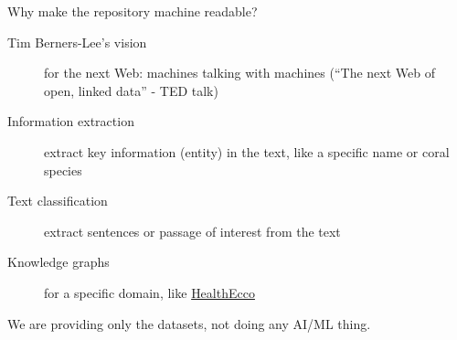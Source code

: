 \documentclass{beamer}
\begin{document}
\begin{frame}{Why make the repository machine readable?}
    \begin{description}
        \item [Tim Berners-Lee's vision] for the next Web: machines talking with machines (``The next Web of open, linked data'' - TED talk)
        \item [Information extraction] extract key information (entity) in the text, like a specific name or coral species
        \item [Text classification] extract sentences or passage of interest from the text
        \item [Knowledge graphs] for a specific domain, like \href{https://healthecco.org/covidgraph/}{HealthEcco}
    \end{description}

    \begin{tcolorbox}
        We are providing only the datasets, not doing any AI/ML thing.
    \end{tcolorbox}
\end{frame}
\end{document}
